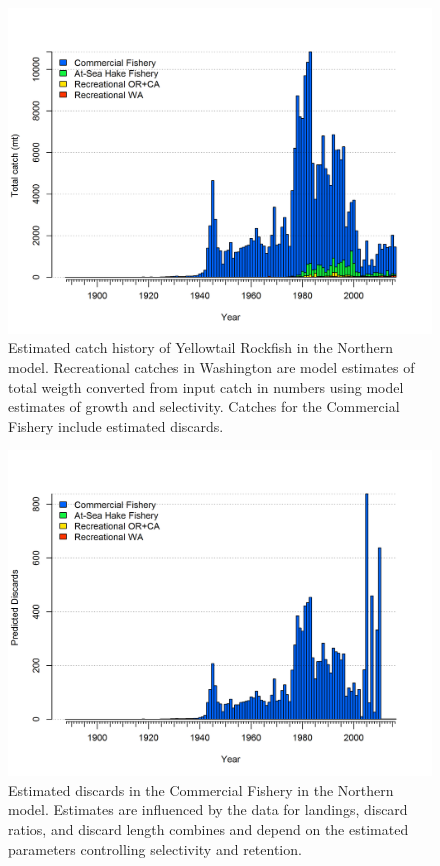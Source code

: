\documentclass[12pt,]{article}
\begin{document}
\FloatBarrier

\begin{figure}[htbp]
\centering
\includegraphics{./tex2pdf.8516/2c0ba03e3878479f1d2a6f0215f507eb3bc3d0b9.png}
\caption{Estimated catch history of Yellowtail Rockfish in the Northern
model. Recreational catches in Washington are model estimates of total
weigth converted from input catch in numbers using model estimates of
growth and selectivity. Catches for the Commercial Fishery include
estimated discards.\label{fig:r4ss_total_catch_N}}
\end{figure}

\begin{figure}[htbp]
\centering
\includegraphics{./tex2pdf.8516/c417c480fe3eca74f4ee871be943f8c49dab0918.png}
\caption{Estimated discards in the Commercial Fishery in the Northern
model. Estimates are influenced by the data for landings, discard
ratios, and discard length combines and depend on the estimated
parameters controlling selectivity and
retention.\label{fig:r4ss_discard_N}}
\end{figure}
\end{document}
